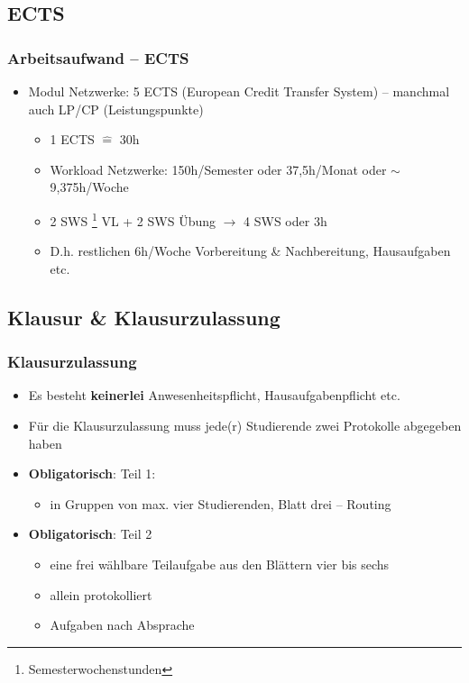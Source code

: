 \documentclass[xcolor=dvipsnames,aspectratio=169]{beamer}
\begin{document}
\subsection{ECTS}
\begin{frame}
	\frametitle{Arbeitsaufwand -- ECTS}
	\begin{itemize}
		\item Modul Netzwerke: 5 ECTS (European Credit Transfer System) -- manchmal auch LP/CP (Leistungspunkte)
			\begin{itemize}
				\item 1 ECTS $\widehat{=}$ 30h
				\item Workload Netzwerke: 150h/Semester oder 37,5h/Monat oder $\sim$ 9,375h/Woche
				\item 2 SWS \footnote{Semesterwochenstunden} VL + 2 SWS Übung $\rightarrow$ 4 SWS oder 3h
				\item D.h. restlichen 6h/Woche Vorbereitung \& Nachbereitung, Hausaufgaben etc.
			\end{itemize}
	\end{itemize}
\end{frame}

\subsection{Klausur \& Klausurzulassung} \label{klausurzulassung}
\begin{frame}
	\frametitle{Klausurzulassung}
	\begin{itemize}
		\item Es besteht \textbf{keinerlei} Anwesenheitspflicht, Hausaufgabenpflicht etc.
		\item Für die Klausurzulassung muss jede(r) Studierende zwei Protokolle abgegeben haben
		\item \textbf{Obligatorisch}: Teil 1:
		\begin{itemize}
			\item in Gruppen von max. vier Studierenden, Blatt drei -- Routing
		\end{itemize}
		\item \textbf{Obligatorisch}: Teil 2
		\begin{itemize}
			\item eine frei wählbare Teilaufgabe aus den Blättern vier bis sechs
			\item allein protokolliert
			\item Aufgaben nach Absprache
		\end{itemize}
	\end{itemize}
\end{frame}
\end{document}
